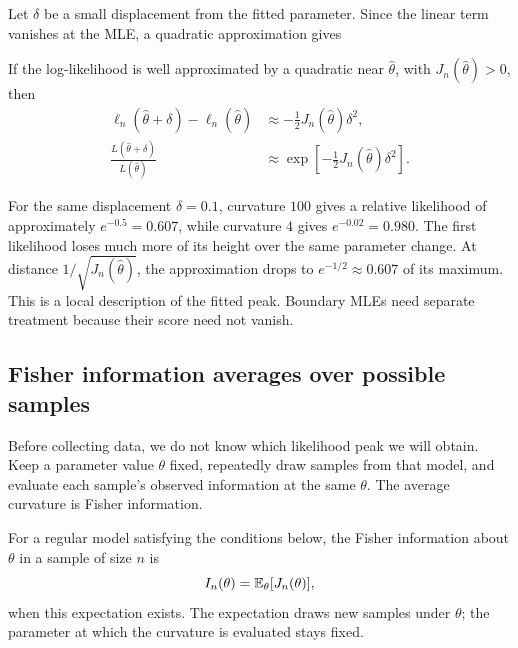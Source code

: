 Let \(\delta\) be a small displacement from the fitted parameter.
Since the linear term vanishes at the MLE, a quadratic approximation gives
\begin{result}
If the log-likelihood is well approximated by a quadratic near
\(\widehat\theta\), with \(J_n(\widehat\theta)>0\), then
\begin{align}
  \ell_n(\widehat\theta+\delta)-\ell_n(\widehat\theta)
     &\approx-\tfrac12 J_n(\widehat\theta)\delta^2,
       \label{eq:observed-log-drop}\\
  \frac{L(\widehat\theta+\delta)}{L(\widehat\theta)}
     &\approx\exp[-\tfrac12 J_n(\widehat\theta)\delta^2].
       \label{eq:observed-relative-likelihood}
\end{align}
\end{result}

For the same displacement \(\delta=0.1\), curvature \(100\) gives a
relative likelihood of approximately \(e^{-0.5}=0.607\), while
curvature \(4\) gives \(e^{-0.02}=0.980\). The first likelihood loses
much more of its height over the same parameter change.
At distance \(1/\sqrt{J_n(\widehat\theta)}\), the approximation drops
to \(e^{-1/2}\approx0.607\) of its maximum.
This is a local description of the fitted peak. Boundary MLEs need
separate treatment because their score need not vanish.

\subsection{Fisher information averages over possible samples}

Before collecting data, we do not know which likelihood peak we will
obtain. Keep a parameter value \(\theta\) fixed, repeatedly draw samples
from that model, and evaluate each sample's observed information at
the same \(\theta\). The average curvature is Fisher information.

\begin{definition}
For a regular model satisfying the conditions below, the Fisher
information about \(\theta\) in a sample of size \(n\) is
\begin{equation}
  I_n(\theta)=\mathbb{E}_\theta[J_n(\theta)],
  \label{eq:fisher-expected}
\end{equation}
when this expectation exists. The expectation draws new samples under
\(\theta\); the parameter at which the curvature is evaluated stays fixed.
\end{definition}

